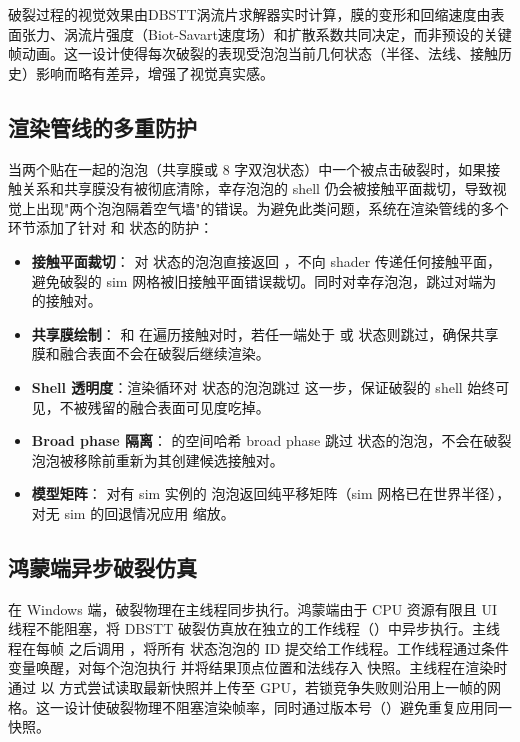 破裂过程的视觉效果由DBSTT涡流片求解器\cite{da2015doublebubbles}实时计算，膜的变形和回缩速度由表面张力、涡流片强度（Biot-Savart速度场）和扩散系数共同决定，而非预设的关键帧动画。这一设计使得每次破裂的表现受泡泡当前几何状态（半径、法线、接触历史）影响而略有差异，增强了视觉真实感。

\subsection{渲染管线的多重防护}

当两个贴在一起的泡泡（共享膜或 $8$ 字双泡状态）中一个被点击破裂时，如果接触关系和共享膜没有被彻底清除，幸存泡泡的 shell 仍会被接触平面裁切，导致视觉上出现"两个泡泡隔着空气墙"的错误。为避免此类问题，系统在渲染管线的多个环节添加了针对  和  状态的防护：

\begin{itemize}
  \item \textbf{接触平面裁切}： 对  状态的泡泡直接返回 ，不向 shader 传递任何接触平面，避免破裂的 sim 网格被旧接触平面错误裁切。同时对幸存泡泡，跳过对端为  的接触对。
  \item \textbf{共享膜绘制}： 和  在遍历接触对时，若任一端处于  或  状态则跳过，确保共享膜和融合表面不会在破裂后继续渲染。
  \item \textbf{Shell 透明度}：渲染循环对  状态的泡泡跳过  这一步，保证破裂的 shell 始终可见，不被残留的融合表面可见度吃掉。
  \item \textbf{Broad phase 隔离}： 的空间哈希 broad phase 跳过  状态的泡泡，不会在破裂泡泡被移除前重新为其创建候选接触对。
  \item \textbf{模型矩阵}： 对有 sim 实例的  泡泡返回纯平移矩阵（sim 网格已在世界半径），对无 sim 的回退情况应用  缩放。
\end{itemize}

\subsection{鸿蒙端异步破裂仿真}

在 Windows 端，破裂物理在主线程同步执行。鸿蒙端由于 CPU 资源有限且 UI 线程不能阻塞，将 DBSTT 破裂仿真放在独立的工作线程（）中异步执行。主线程在每帧  之后调用 ，将所有  状态泡泡的 ID 提交给工作线程。工作线程通过条件变量唤醒，对每个泡泡执行  并将结果顶点位置和法线存入  快照。主线程在渲染时通过  以  方式尝试读取最新快照并上传至 GPU，若锁竞争失败则沿用上一帧的网格。这一设计使破裂物理不阻塞渲染帧率，同时通过版本号（）避免重复应用同一快照。

